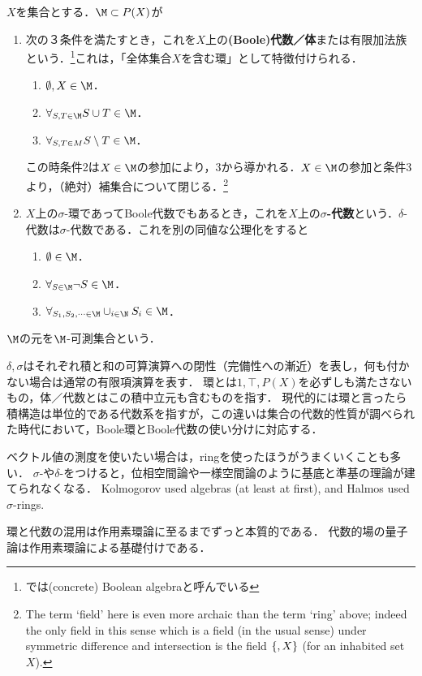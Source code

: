 \documentclass[uplatex, dvipdfmx]{jsreport}
\begin{document}
\begin{definition}\label{def-sigma-algebra}
    $X$を集合とする．$\M\subset P(X)$が
    \begin{enumerate}
        \item 次の３条件を満たすとき，これを$X$上の\textbf{(Boole)代数／体}または有限加法族という．\footnote{\cite{Tao11-MeasureTheory}では(concrete) Boolean algebraと呼んでいる}これは，「全体集合$X$を含む環」として特徴付けられる．
        \begin{enumerate}[1]
            \item $\emptyset,X\in\M$．
            \item $\forall_{S,T\in\M}S\cup T\in\M$．
            \item $\forall_{S,T\in M}S\setminus T\in\M$．
        \end{enumerate}
        この時条件2は$X\in\M$の参加により，3から導かれる．$X\in\M$の参加と条件3より，（絶対）補集合について閉じる．\footnote{The term ‘field’ here is even more archaic than the term ‘ring’ above; indeed the only field in this sense which is a field (in the usual sense) under symmetric difference and intersection is the field $\{\empty, X\}$ (for an inhabited set $X$).}
        \item $X$上の$\sigma$-環であってBoole代数でもあるとき，これを$X$上の\textbf{$\sigma$-代数}という．$\delta$-代数は$\sigma$-代数である．これを別の同値な公理化をすると
        \begin{enumerate}[1]
            \item $\emptyset\in\M$．
            \item $\forall_{S\in\M}\lnot S\in\M$．
            \item $\forall_{S_1,S_2,\cdots\in\M}\cup_{i\in\N}S_i\in\M$．
        \end{enumerate}
    \end{enumerate}
    $\M$の元を$\M$-可測集合という．
\end{definition}
\begin{remark}
    $\delta,\sigma$はそれぞれ積と和の可算演算への閉性（完備性への漸近）を表し，何も付かない場合は通常の有限項演算を表す．
    環とは$1,\top,P(X)$を必ずしも満たさないもの，体／代数とはこの積中立元も含むものを指す．
    現代的には環と言ったら積構造は単位的である代数系を指すが，この違いは集合の代数的性質が調べられた時代において，Boole環とBoole代数の使い分けに対応する．

    ベクトル値の測度を使いたい場合は，ringを使ったほうがうまくいくことも多い．
    $\sigma$-や$\delta$-をつけると，位相空間論や一様空間論のように基底と準基の理論が建てられなくなる．
    Kolmogorov used algebras (at least at first), and Halmos used $\sigma$-rings.

    環と代数の混用は作用素環論に至るまでずっと本質的である．
    代数的場の量子論は作用素環論による基礎付けである．
\end{remark}
\end{document}
